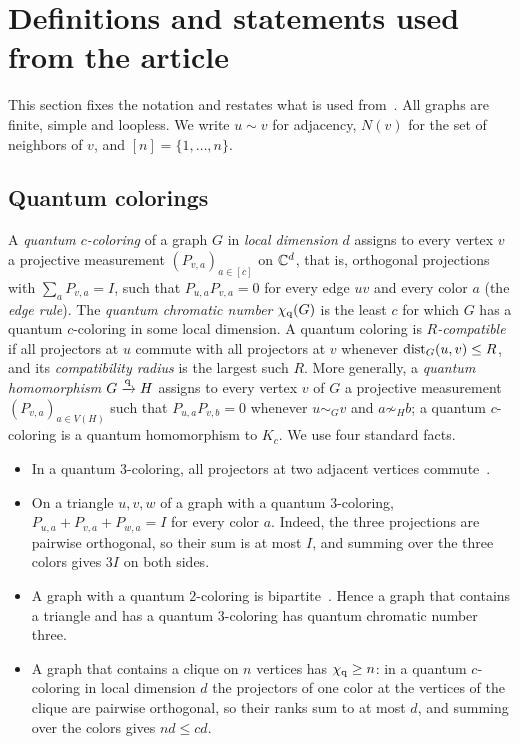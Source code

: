 \section{Definitions and statements used from the article}\label{sec:background}

This section fixes the notation and restates what is used from~\cite{Z}. All graphs are finite, simple and loopless. We write $u\sim v$ for adjacency, $N(v)$ for the set of neighbors of $v$, and $[n]=\{1,\ldots,n\}$.

\subsection{Quantum colorings}\label{sec:quantum}

A \emph{quantum $c$-coloring} of a graph $G$ in \emph{local dimension} $d$ assigns to every vertex $v$ a projective measurement $(P_{v,a})_{a\in[c]}$ on $\mathbb C^d$, that is, orthogonal projections with $\sum_aP_{v,a}=I$, such that $P_{u,a}P_{v,a}=0$ for every edge $uv$ and every color $a$ (the \emph{edge rule}). The \emph{quantum chromatic number} $\chi_{\mathrm q}(G)$ is the least $c$ for which $G$ has a quantum $c$-coloring in some local dimension. A quantum coloring is \emph{$R$-compatible} if all projectors at $u$ commute with all projectors at $v$ whenever $\operatorname{dist}_G(u,v)\le R$, and its \emph{compatibility radius} is the largest such $R$. More generally, a \emph{quantum homomorphism} $G\xrightarrow{\mathrm q} H$ assigns to every vertex $v$ of $G$ a projective measurement $(P_{v,a})_{a\in V(H)}$ such that $P_{u,a}P_{v,b}=0$ whenever $u\sim_Gv$ and $a\not\sim_Hb$; a quantum $c$-coloring is a quantum homomorphism to $K_c$. We use four standard facts.
\begin{itemize}
\item[(Q1)] In a quantum $3$-coloring, all projectors at two adjacent vertices commute~\cite[Lemma~2]{Ji}.
\item[(Q2)] On a triangle $u,v,w$ of a graph with a quantum $3$-coloring, $P_{u,a}+P_{v,a}+P_{w,a}=I$ for every color $a$. Indeed, the three projections are pairwise orthogonal, so their sum is at most $I$, and summing over the three colors gives $3I$ on both sides.
\item[(Q3)] A graph with a quantum $2$-coloring is bipartite~\cite[Proposition~3]{CMNSW}. Hence a graph that contains a triangle and has a quantum $3$-coloring has quantum chromatic number three.
\item[(Q4)] A graph that contains a clique on $n$ vertices has $\chi_{\mathrm q}\ge n$: in a quantum $c$-coloring in local dimension $d$ the projectors of one color at the vertices of the clique are pairwise orthogonal, so their ranks sum to at most $d$, and summing over the colors gives $nd\le cd$.
\end{itemize}

